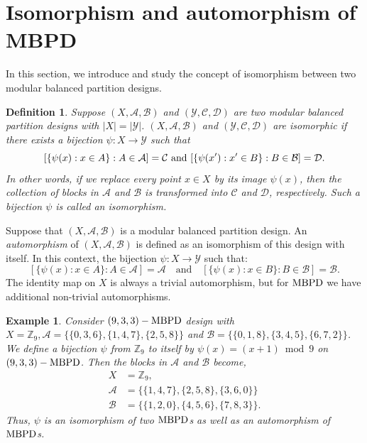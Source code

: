 \documentclass[preprint,11pt]{elsarticle}
\newcommand{\MBPD}{\textnormal{MBPD}}
\newtheorem{definition}[theorem]{Definition}
\newtheorem{example}[theorem]{Example}
\begin{document}
 \section{Isomorphism and automorphism of \MBPD}
 In this section, we introduce and study the concept of isomorphism between two modular balanced partition designs. 
 \begin{definition} Suppose $(X, \mathcal{A}, \mathcal{B})$ and $(\mathcal{Y}, \mathcal{C}, \mathcal{D})$ are two modular balanced partition designs with $|X|=|\mathcal{Y}|$.  $(X, \mathcal{A}, \mathcal{B})$ and $(\mathcal{Y}, \mathcal{C}, \mathcal{D})$  are isomorphic if there exists a bijection $\psi: X\rightarrow \mathcal{Y}$ such that \[[\{\psi(x): x \in A\}: A \in \mathcal{A}]= \mathcal{C} \textnormal{~and~}[\{\psi(x'): x'\in B\}: B \in \mathcal{B}]= \mathcal{D}.\]
 \noindent In other words, if we replace  every point $x\in X$ by its image $\psi(x)$, then the collection of blocks in $\mathcal{A}$ and $\mathcal{B}$ is transformed into $\mathcal{C}$ and $\mathcal{D}$, respectively. Such a bijection $\psi$ is called an isomorphism.
\end{definition}

Suppose that \((X, \mathcal{A}, \mathcal{B})\) is a modular balanced partition design. An \textit{automorphism} of \((X, \mathcal{A}, \mathcal{B})\) is defined as an isomorphism of this design with itself.  In this context, the bijection \(\psi :X \rightarrow \mathcal{Y}\)  such that: 
\[
[ \{\psi(x) : x \in A\} : A \in \mathcal{A} ]= \mathcal{A} 
\quad \text{and} \quad 
[\{\psi(x) : x \in B\} : B \in \mathcal{B}] = \mathcal{B}.
\]
The identity map on $X$ is always a trivial automorphism, but for $\MBPD$ we have additional non-trivial automorphisms. 
\begin{example}\label{ex} Consider $(9, 3,3)-\MBPD$ design with $X  =\mathbb{Z}_{9}, 
   \mathcal{A}  =\{\{0,3,6\}, \{1,4,7\},\{2,5,8\}\}$ and $
    \mathcal{B}  = \{\{0,1,8\}, \{3,4,5\},\{6,7,2\} \}$.
We define a bijection $\psi$ from $\mathbb{Z}_9$ to itself  by $\psi(x)=(x+1)\bmod{9}$ on $(9, 3,3)-\MBPD$. Then the blocks in $\mathcal{A}$ and $\mathcal{B}$ become, 
\begin{align*}
 X&  =\mathbb{Z}_{9},\\ 
    \mathcal{A} &  =\{\{1,4,7\}, \{2,5,8\},\{3,6,0\}\}\\
    \mathcal{B} &  = \{\{1,2,0\}, \{4,5,6\},\{7,8,3\} \}.
\end{align*}
Thus, \(\psi\) is an isomorphism of two \(\MBPD\)s as well as an automorphism of \(\MBPD\)s. 
\end{example}
\end{document}
